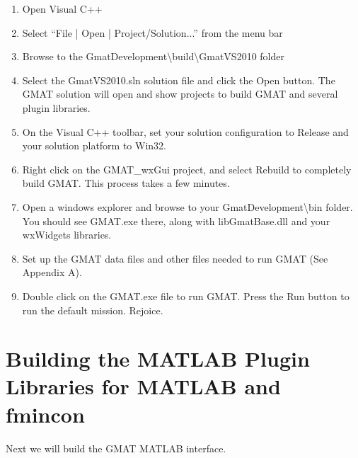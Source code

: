 \documentclass[letterpaper,10pt]{article}%
\begin{document}
\begin{enumerate}
\item Open Visual C++
\item Select ``File | Open | Project/Solution...'' from the menu bar
\item Browse to the GmatDevelopment\textbackslash build\textbackslash GmatVS2010 folder
\item Select the GmatVS2010.sln solution file and click the Open button.  The GMAT solution will open and show projects to build GMAT and several plugin libraries.
\item On the Visual C++ toolbar, set your solution configuration to Release and your solution platform to Win32.
\item Right click on the GMAT\_wxGui project, and select Rebuild to completely build GMAT.  This process takes a few minutes.  
\item Open a windows explorer and browse to your GmatDevelopment\textbackslash bin folder.  You should see GMAT.exe there, along with libGmatBase.dll and your wxWidgets libraries.
\item Set up the GMAT data files and other files needed to run GMAT (See Appendix A).
\item Double click on the GMAT.exe file to run GMAT.  Press the Run button to run the default mission.  Rejoice.
\end{enumerate}

\section{Building the MATLAB Plugin Libraries for MATLAB and fmincon}

Next we will build the GMAT MATLAB interface.
\end{document}

